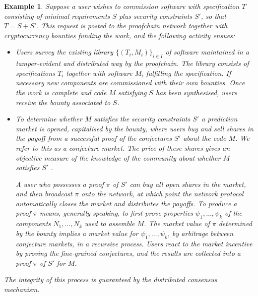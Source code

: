 \documentclass[english,letter paper,12pt,reqno]{article}
\theoremstyle{example}
\newtheorem{example}[theorem]{Example}
\begin{document}
\begin{example}\label{example:proof} Suppose a user wishes to commission software with specification $T$ consisting of minimal requirements $S$ plus security constraints $S'$, so that $T = S + S'$. This request is posted to the proofchain network together with cryptocurrency bounties funding the work, and the following activity ensues:
\begin{itemize}
\item Users survey the existing library $\{ (T_i, M_i) \}_{i \in I}$ of software maintained in a tamper-evident and distributed way by the proofchain. The library consists of specifications $T_i$ together with software $M_i$ fulfilling the specification. If necessary new components are commissioned with their own bounties. Once the work is complete and code $M$ satisfying $S$ has been synthesised, users receive the bounty associated to $S$.

\item To determine whether $M$ satisfies the security constraints $S'$ a prediction market is opened, capitalised by the bounty, where users buy and sell shares in the payoff from a successful proof of the conjectures $S'$ about the code $M$. We refer to this as a \emph{conjecture market}. The price of these shares gives an objective measure of the knowledge of the community about whether $M$ satisfies $S'$ \cite{hanson3}.

A user who possesses a proof $\pi$ of $S'$ can buy all open shares in the market, and then broadcast $\pi$ onto the network, at which point the network protocol automatically closes the market and distributes the payoffs. To produce a proof $\pi$ means, generally speaking, to first prove properties $\psi_1,\ldots,\psi_k$ of the components $N_1,\ldots,N_k$ used to assemble $M$. The market value of $\pi$ determined by the bounty implies a market value for $\psi_1,\ldots,\psi_k$, by arbitrage between conjecture markets, in a recursive process. Users react to the market incentive by proving the fine-grained conjectures, and the results are collected into a proof $\pi$ of $S'$ for $M$.
\end{itemize}
The integrity of this process is guaranteed by the distributed consensus mechanism.
\end{example}
\end{document}
